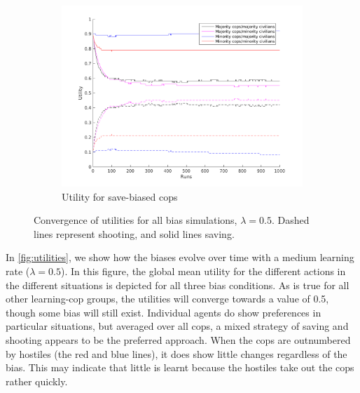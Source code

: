 \begin{figure}[!ht]
\begin{subfigure}[b]{0.62\textwidth}
        \includegraphics[width=\textwidth]{./pictures/Utility05BiasSave}
        \caption{Utility for save-biased cops }
        \label{fig:utSave}
    \end{subfigure}
\caption{Convergence of utilities for all bias simulations, $\lambda = 0.5$. Dashed lines represent shooting, and solid lines saving. }
\label{fig:utilities}
\end{figure}
In \autoref{fig:utilities}, we show how the biases evolve over time with a medium learning rate ($\lambda = 0.5$). In this figure, the global mean utility for the different actions in the different situations is depicted for all three bias conditions. As is true for all other learning-cop groups, the utilities will converge towards a value of 0.5, though some bias will still exist. Individual agents do show preferences in particular situations, but averaged over all cops, a mixed strategy of saving and shooting appears to be the preferred approach. When the cops are outnumbered by hostiles (the red and blue lines), it does show little changes regardless of the bias. This may indicate that little is learnt because the hostiles take out the cops rather quickly. 


